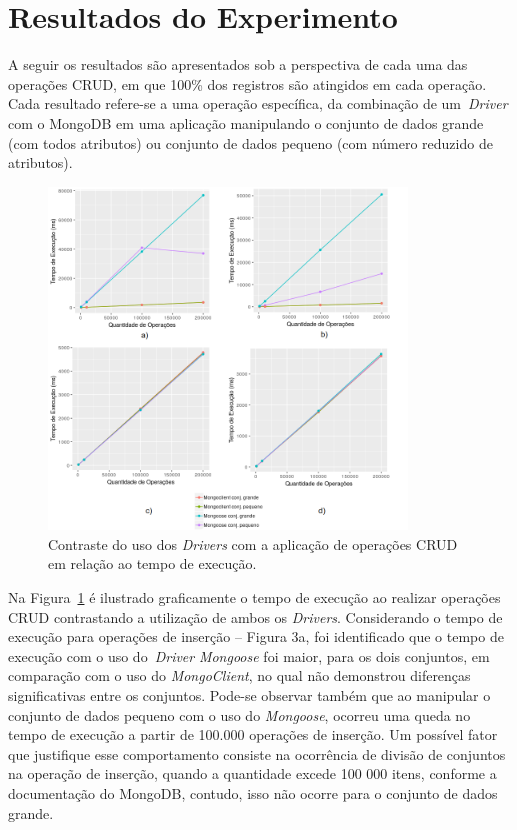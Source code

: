 \documentclass{svproc}
\begin{document}
\section{Resultados do Experimento}
\label{section:resultados}

A seguir os resultados são apresentados sob a perspectiva de cada uma das operações CRUD, em que 100\% dos registros são atingidos em cada operação. 
Cada resultado refere-se a uma operação específica, da combinação de um~\emph{Driver} com o MongoDB em uma aplicação manipulando o conjunto de dados grande (com todos atributos) ou conjunto de dados pequeno (com número reduzido de atributos).

\begin{figure}[!ht]
\centering
\includegraphics[width=0.85\textwidth]{images/time}
\caption{Contraste do uso dos \emph{Drivers} com a aplicação de operações CRUD em relação ao tempo de execução.}
\label{fig:time}
\end{figure}

Na Figura~\ref{fig:time} é ilustrado graficamente o tempo de execução ao realizar operações CRUD contrastando a utilização de ambos os \emph{Drivers}. Considerando o tempo de execução para operações de inserção -- Figura 3a, foi identificado que o tempo de execução com o uso do~\emph{Driver} \emph{Mongoose} foi maior, para os dois conjuntos, em comparação com o uso do \emph{MongoClient}, no qual não demonstrou diferenças significativas entre os conjuntos. Pode-se observar também que ao manipular o conjunto de dados pequeno com o uso do \emph{Mongoose}, ocorreu uma queda no tempo de execução a partir de 100.000 operações de inserção. Um possível fator que justifique esse comportamento consiste na ocorrência de divisão de conjuntos na operação de inserção, quando a quantidade excede 100 000 itens, conforme a documentação do MongoDB, contudo, isso não ocorre para o conjunto de dados grande.
\end{document}
